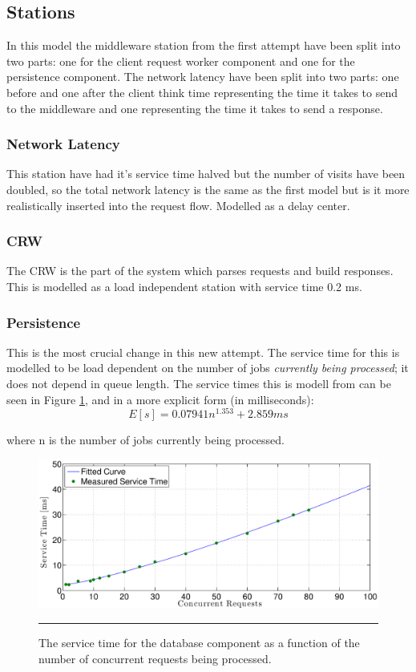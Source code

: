 \documentclass[a4paper, 11pt]{article}
\begin{document}
\subsection{Stations}

	In this model the middleware station from the first attempt have been split into two parts: one for the client request worker component and one for the persistence component. The network latency have been split into two parts: one before and one after the client think time representing the time it takes to send to the middleware and one representing the time it takes to send a response.

	\subsubsection{Network Latency}
		This station have had it's service time halved but the number of visits have been doubled, so the total network latency is the same as the first model but is it more realistically inserted into the request flow. Modelled as a delay center.

	\subsubsection{CRW}
		The CRW is the part of the system which parses requests and build responses. This is modelled as a load independent station with service time 0.2 ms.

	\subsubsection{Persistence}
		This is the most crucial change in this new attempt. The service time for this is modelled to be load dependent on the number of jobs \textit{currently being processed}; it does not depend in queue length. The service times this is modell from can be seen in Figure \ref{fig:db-service-time}, and in a more explicit form (in milliseconds):
		\[ E[s] = 0.07941n^{1.353} + 2.859 ms\]

		where n is the number of jobs currently being processed.

		\begin{figure}[cht!]
			\centering
				\includegraphics[width=\linewidth]{dbServiceTime}
				\rule{35em}{0.5pt}
			\caption{The service time for the database component as a function of the number of concurrent requests being processed.}
			\label{fig:db-service-time}
		\end{figure}
		\FloatBarrier
	
\end{document}
